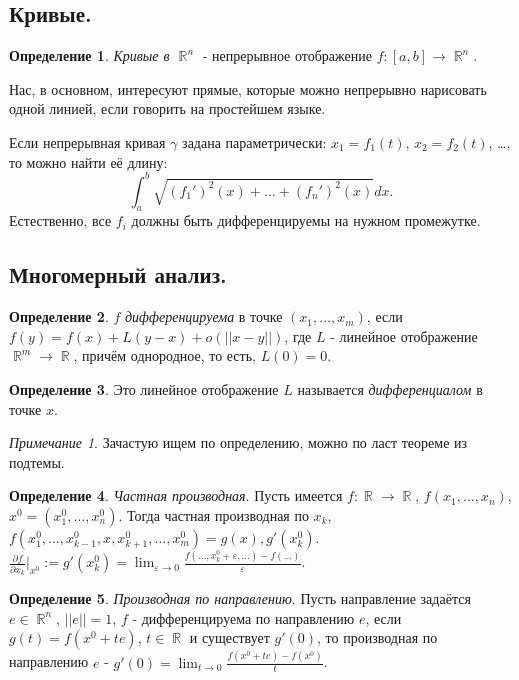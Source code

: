 \documentclass[a4paper,100pt]{article}
\theoremstyle{indented}
\theoremstyle{definition}
\newtheorem{defn}{Определение}
\theoremstyle{remark}
\newtheorem{remark}{Примечание}
\DeclareMathOperator{\RR}{\mathbb{R}}
\begin{document}
\subsection{Кривые.}

\begin{defn}
    \textit{Кривые в $\RR^n$} - непрерывное отображение $f:[a, b]\rightarrow \RR^n$.
\end{defn}

Нас, в основном, интересуют прямые, которые можно непрерывно нарисовать одной линией, если говорить на простейшем языке. \ 

Если непрерывная кривая $\gamma$ задана параметрически: $x_1=f_1(t)$, $x_2=f_2(t)$, \dots, то можно найти её длину:
\[
    \int_a^b\sqrt{(f_1')^2(x)+\ldots+(f_n')^2(x)}dx. 
\]
Естественно, все $f_i$ должны быть дифференцируемы на нужном промежутке.

\subsection{Многомерный анализ.} 

\begin{defn}
    $f$ \textit{дифференцируема} в точке $(x_1, \ldots, x_m)$, если $f(y)=f(x)+L(y-x)+o(||x-y||)$, где $L$ - линейное отображение $\RR^m\rightarrow \RR$, причём однородное, то есть, $L(0)=0$.
\end{defn}

\begin{defn}
    Это линейное отображение $L$ называется \textit{дифференциалом} в точке $x$.
\end{defn}

\begin{remark}
    Зачастую ищем по определению, можно по ласт теореме из подтемы.
\end{remark}

\begin{defn}
    \textit{Частная производная}. Пусть имеется $f:\RR\rightarrow \RR$, $f(x_1, \ldots, x_n)$, $x^0=(x_1^0, \ldots, x_n^0)$. Тогда частная производная по $x_k $, $f(x_1^0, \ldots, x_{k-1}^0, x, x_{k+1}^0, \ldots, x_m^0)=g(x), g'(x_k^0)$. $\frac{\partial f}{\partial x_k}\bigg|_{x^0}:=g'(x_k^0)=\lim_{\varepsilon\rightarrow 0}\frac{f(\ldots, x_k^0+\varepsilon, \ldots)-f(\ldots)}{\varepsilon}$. 
\end{defn}

\begin{defn}
    \textit{Производная по направлению}. Пусть направление задаётся $e\in\RR^n$, $||e||=1$, $f$ - дифференцируема по направлению $e$, если $g(t)=f(x^0+te)$, $t\in\RR$ и существует $g'(0)$, то производная по направлению $e$ - $g'(0)=\lim_{t\rightarrow 0}\frac{f(x^0+te)-f(x^0)}{t}$. 
\end{defn}
\end{document}
